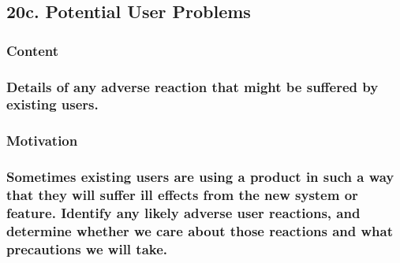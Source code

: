 \documentclass[
]{article}
\begin{document}
\hypertarget{c.-potential-user-problems}{%
\subsection{20c. Potential User
Problems}\label{c.-potential-user-problems}}

\hypertarget{content-66}{%
\subsubsection{Content}\label{content-66}}

\hypertarget{details-of-any-adverse-reaction-that-might-be-suffered-by-existing-users.}{%
\subsubsection{Details of any adverse reaction that might be suffered by
existing
users.}\label{details-of-any-adverse-reaction-that-might-be-suffered-by-existing-users.}}

\hypertarget{motivation-65}{%
\subsubsection{Motivation}\label{motivation-65}}

\hypertarget{sometimes-existing-users-are-using-a-product-in-such-a-way-that-they-will-suffer-ill-effects-from-the-new-system-or-feature.-identify-any-likely-adverse-user-reactions-and-determine-whether-we-care-about-those-reactions-and-what-precautions-we-will-take.}{%
\subsubsection{\texorpdfstring{Sometimes existing users are using a
product in such a way that they will suffer ill effects from the new
system or feature. Identify any likely adverse user reactions, and
determine whether we care about those reactions and what precautions we
will take.
}{Sometimes existing users are using a product in such a way that they will suffer ill effects from the new system or feature. Identify any likely adverse user reactions, and determine whether we care about those reactions and what precautions we will take. }}\label{sometimes-existing-users-are-using-a-product-in-such-a-way-that-they-will-suffer-ill-effects-from-the-new-system-or-feature.-identify-any-likely-adverse-user-reactions-and-determine-whether-we-care-about-those-reactions-and-what-precautions-we-will-take.}}
\end{document}
